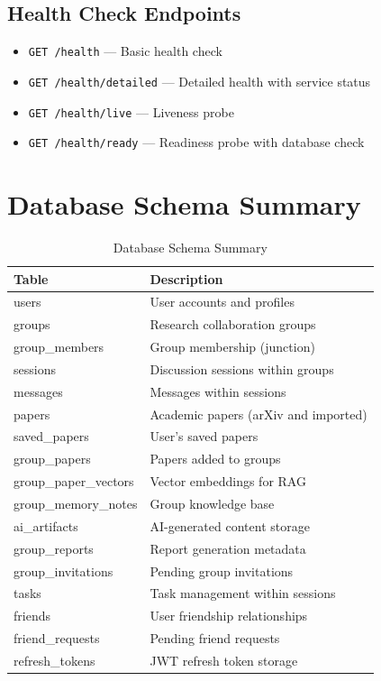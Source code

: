 \documentclass[11pt,a4paper]{article}
\begin{document}
\subsection{Health Check Endpoints}

\begin{itemize}
    \item \texttt{GET /health} --- Basic health check
    \item \texttt{GET /health/detailed} --- Detailed health with service status
    \item \texttt{GET /health/live} --- Liveness probe
    \item \texttt{GET /health/ready} --- Readiness probe with database check
\end{itemize}

\section{Database Schema Summary}

\begin{table}[H]
\centering
\begin{tabular}{p{5cm}p{8cm}}
\toprule
\textbf{Table} & \textbf{Description} \\
\midrule
users & User accounts and profiles \\
groups & Research collaboration groups \\
group\_members & Group membership (junction) \\
sessions & Discussion sessions within groups \\
messages & Messages within sessions \\
papers & Academic papers (arXiv and imported) \\
saved\_papers & User's saved papers \\
group\_papers & Papers added to groups \\
group\_paper\_vectors & Vector embeddings for RAG \\
group\_memory\_notes & Group knowledge base \\
ai\_artifacts & AI-generated content storage \\
group\_reports & Report generation metadata \\
group\_invitations & Pending group invitations \\
tasks & Task management within sessions \\
friends & User friendship relationships \\
friend\_requests & Pending friend requests \\
refresh\_tokens & JWT refresh token storage \\
\bottomrule
\end{tabular}
\caption{Database Schema Summary}
\end{table}
\end{document}
